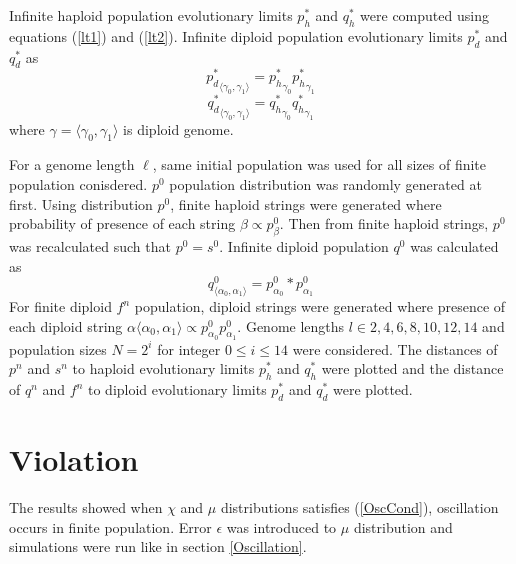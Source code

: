 Infinite haploid population evolutionary limits $p_h^{\ast}$ and $q_h^{\ast}$ were computed using equations (\ref{lt1}) and (\ref{lt2}). Infinite diploid population evolutionary limits $p_d^{\ast}$ and $q_d^{\ast}$ as
\[
{p_d^{\ast}}_{\langle \gamma_0, \gamma_1 \rangle} = {p_h^{\ast}}_{\gamma_0} {p_h^{\ast}}_{\gamma_1}
\]
\[
{q_d^{\ast}}_{\langle \gamma_0, \gamma_1 \rangle} = {q_h^{\ast}}_{\gamma_0} {q_h^{\ast}}_{\gamma_1}
\]
where $\gamma = \langle \gamma_0, \gamma_1 \rangle$ is diploid genome.

For a genome length $\ell$, same initial population was used for all sizes of finite population conisdered.
 $p^0$ population distribution was randomly generated at first. Using distribution $p^0$, finite haploid strings were generated where probability of presence of each string $\beta \propto p^0_\beta$. Then from finite haploid strings, $p^0$ was recalculated such that $p^0 = s^0$. Infinite diploid population $q^0$ was calculated as
\[
q^0_{\langle \alpha_0, \alpha_1 \rangle} = p^0_{\alpha_0} * p^0_{\alpha_1}
\]
For finite diploid $f^n$ population, diploid strings were generated where presence of each diploid string $\alpha \langle \alpha_0, \alpha_1 \rangle \propto p^0_{\alpha_0} p^0_{\alpha_1}$.
Genome lengths $l \in {2, 4, 6, 8, 10, 12, 14}$ and population sizes $N = 2^i$ for integer $0 \leq i \leq 14$ were considered. The distances of $p^n$ and $s^n$ to haploid evolutionary limits $p_h^{\ast}$ and $q_h^{\ast}$ were plotted and the distance of $q^n$ and $f^n$ to diploid evolutionary limits $p_d^{\ast}$ and $q_d^{\ast}$ were plotted.


\section{Violation}
The results showed when $\chi$ and $\mu$ distributions satisfies (\ref{OscCond}), oscillation occurs in finite population. Error $\epsilon$ was introduced to $\mu$ distribution and simulations were run like in section \ref{Oscillation}.





 
